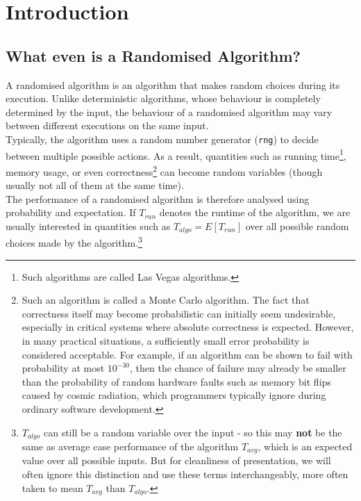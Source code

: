 \documentclass[11pt,openany]{book}
\begin{document}
\pagestyle{plain}
\thispagestyle{empty}%
\setcounter{page}{1}%
\tableofcontents

\chapter{Introduction}

\section{What even is a Randomised Algorithm?}

A randomised algorithm is an algorithm that makes random choices during its execution. 
Unlike deterministic algorithms, 
whose behaviour is completely determined by the input,
 the behaviour of a randomised algorithm may vary between different executions on the same input.\\


\noindent Typically, the algorithm uses a random number generator (\texttt{rng}) to decide between multiple possible actions. 
As a result, quantities such as running time\footnote{Such algorithms are called Las Vegas algorithms.}, 
memory usage, or even correctness\footnote{
Such an algorithm is called a Monte Carlo algorithm. The fact that correctness itself may become probabilistic can 
initially seem undesirable, especially in critical systems where 
absolute correctness is expected. However, in many practical situations, a sufficiently small error probability
is considered acceptable. For example, if an algorithm can be shown to fail with probability at 
most \(10^{-30}\), then the chance of failure may already be smaller than the probability of random hardware faults such as memory
bit flips caused by cosmic radiation, which programmers typically ignore during ordinary software development.
} can become random variables (though usually not all of them at the same time).\\


\noindent The performance of a randomised algorithm is therefore analysed using probability and expectation. 
If $T_{run}$ denotes the runtime of the algorithm, we are usually interested in quantities 
such as $T_{algo}=E[T_{run}]$ over all possible random choices made by the algorithm.\footnote{$T_{algo}$ can still be a random variable over the input - so this may \textbf{not} be 
the same as average case performance of the algorithm $T_{avg}$, which is an expected value over all possible inputs.
But for cleanliness of presentation, we will often ignore this distinction and use these terms interchangeably, more often taken to mean $T_{avg}$ than $T_{algo}$.}
\end{document}
